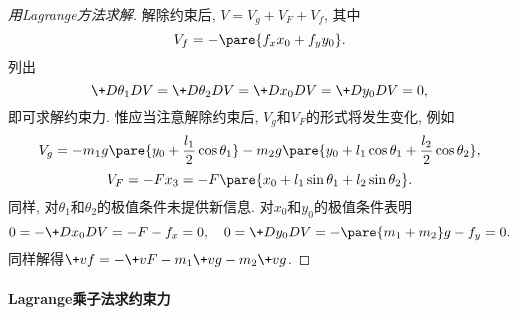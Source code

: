 \documentclass[../LectureNotes.tex]{subfiles}
\begin{document}
\begin{sample}
\begin{proof}[用Lagrange方法求解]
        解除约束后, $V=V_g + V_F + V_f$, 其中
        \[ V_f = -\pare{f_x x_0 + f_y y_0}. \]
        列出
        \[ \+D{\theta_1}DV = \+D{\theta_2}DV = \+D{x_0}DV = \+D{y_0}DV = 0, \]
        即可求解约束力. 惟应当注意解除约束后, $V_g$和$V_F$的形式将发生变化, 例如
        \[ V_g = -m_1 g\pare{y_0 + \frac{l_1}{2}\cos\theta_1} - m_2 g\pare{y_0 + l_1\cos\theta_1 + \frac{l_2}{2}\cos\theta_2}, \]
        \[ V_F = -Fx_3 = -F\pare{x_0 + l_1\sin\theta_1 + l_2\sin\theta_2}. \]
        同样, 对$\theta_1$和$\theta_2$的极值条件未提供新信息. 对$x_0$和$y_0$的极值条件表明
        \[ 0 = -\+D{x_0}D{V} = -F - f_x = 0,\quad 0 = \+D{y_0}DV = -\pare{m_1+m_2}g - f_y = 0. \]
        同样解得$\+vf = -\+vF - m_1\+vg - m_2\+vg$.
    \end{proof}
\end{sample}


\paragraph{Lagrange乘子法求约束力} %
\label{par:lagrange乘子法求约束力}
\end{document}
